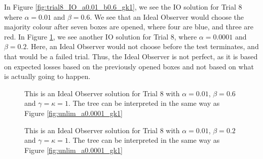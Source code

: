 In Figure \ref{fig:trial8_IO_a0.01_b0.6_gk1}, we see the IO solution for Trial 8 where $\alpha=0.01$ and $\beta=0.6$. We see that an Ideal Observer would choose the majority colour after seven boxes are opened, where four are blue, and three are red. In Figure \ref{fig:trial8_IO_a0.0001_b0.2_gk1}, we see another IO solution for Trial 8, where $\alpha=0.0001$ and $\beta=0.2$. Here, an Ideal Observer would not choose before the test terminates, and that would be a failed trial. Thus, the Ideal Observer is not perfect, as it is based on expected losses based on the previously opened boxes and not based on what is actually going to happen.
\begin{figure}
    \centering
     \begin{minipage}[t]{0.45\textwidth}
        \centering
        \scalebox{0.7}{}
        \caption[IO solution, Trial 8. $\alpha=0.01$, $\beta=0.6$ and $\gamma=\kappa=1$.]{This is an Ideal Observer solution for Trial 8 with $\alpha=0.01$, $\beta=0.6$ and $\gamma=\kappa=1$. The tree can be interpreted in the same way as Figure \ref{fig:unlim_a0.0001_gk1}}
        \label{fig:trial8_IO_a0.01_b0.6_gk1}
     \end{minipage}\hfill
     \begin{minipage}[t]{0.45\textwidth}
        \centering
        \scalebox{0.7}{}
        \caption[IO solution, Trial 8. $\alpha=0.0001$, $\beta=0.2$ and $\gamma=\kappa=1$.]{This is an Ideal Observer solution for Trial 8 with $\alpha=0.01$, $\beta=0.2$ and $\gamma=\kappa=1$. The tree can be interpreted in the same way as Figure \ref{fig:unlim_a0.0001_gk1}}
        \label{fig:trial8_IO_a0.0001_b0.2_gk1}
     \end{minipage}
\end{figure}





